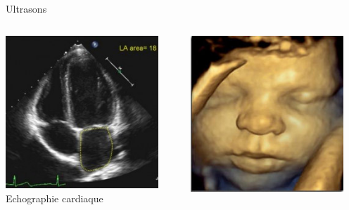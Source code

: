 \documentclass{beamer}
\begin{document}
\begin{frame}{Ultrasons}
 \begin{columns}[T]
 \begin{column}{0.32\textwidth}
 \centering
\includegraphics[width=0.9\textwidth]{images/echocardio.jpg}\\
Echographie cardiaque
 \end{column}
 \begin{column}{0.32\textwidth}
 \centering
\includegraphics[width=0.9\textwidth]{images/echo3d.jpg}\\

\end{column}
\end{columns}
\end{frame}
\end{document}
